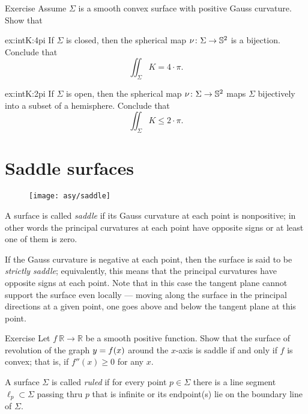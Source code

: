 \begin{thm}{Exercise}\label{ex:intK}
Assume $\Sigma$ is a smooth convex surface with positive Gauss curvature.
Show that 

\begin{subthm}{ex:intK:4pi}
If $\Sigma$ is closed, then the spherical map $\nu\colon\Sigma\to \mathbb{S}^2$ is a bijection. Conclude that 
\[\iint_\Sigma K=4\cdot\pi.\]
\end{subthm}
\begin{subthm}{ex:intK:2pi}
If $\Sigma$ is open, then  the spherical map $\nu\colon\Sigma\to \mathbb{S}^2$
maps $\Sigma$ bijectively into a subset of a hemisphere. Conclude that 
\[\iint_\Sigma K\le 2\cdot\pi.\]
\end{subthm}
\end{thm}



\section{Saddle surfaces}\label{sec:saddle}

\begin{wrapfigure}{r}{43 mm}
\vskip-8mm
\centering
\texttt{[image: asy/saddle]}
\vskip0mm
\end{wrapfigure}

A surface is called \emph{saddle} if its Gauss curvature at each point is nonpositive;
in other words the principal curvatures at each point have opposite signs or at least one of them is zero.

If the Gauss curvature is negative at each point,
then the surface is said to be {}\emph{strictly saddle};
equivalently, this means that the principal curvatures have opposite signs at each point.
Note that in this case the tangent plane cannot support the surface even locally --- moving along the surface in the principal directions at a given point, one goes above and below the tangent plane at this point.  


\begin{thm}{Exercise}\label{ex:convex-revolution}
Let $f\:\mathbb{R}\to\mathbb{R}$ be a smooth positive function.
Show that the surface of revolution of the graph $y\z=f(x)$ around the $x$-axis
 is saddle if and only if $f$ is convex; that is, if $f''(x)\ge0$ for any $x$.
\end{thm}

A surface $\Sigma$ is called \emph{ruled} if for every point $p\in \Sigma$ there is a line segment $\ell_p\subset \Sigma$ passing thru $p$ that is infinite or its endpoint(s) lie on the boundary line of $\Sigma$.


